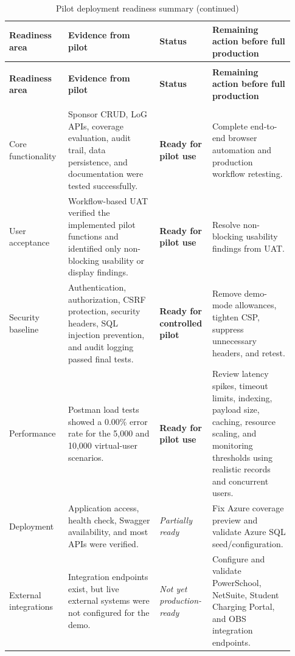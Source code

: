 \setlength{\LTleft}{0pt}
\setlength{\LTright}{\fill}
\begin{longtable}{>{\raggedright\arraybackslash}p{0.20\linewidth}
>{\raggedright\arraybackslash}p{0.31\linewidth}
>{\raggedright\arraybackslash}p{0.17\linewidth}
>{\raggedright\arraybackslash}p{0.25\linewidth}}
\caption{Pilot deployment readiness summary}\label{table:readiness-summary}\\
\toprule
\textbf{Readiness area} & \textbf{Evidence from pilot} & \textbf{Status} & \textbf{Remaining action before full production} \\
\midrule
\endfirsthead
\caption[]{Pilot deployment readiness summary (continued)}\\
\toprule
\textbf{Readiness area} & \textbf{Evidence from pilot} & \textbf{Status} & \textbf{Remaining action before full production} \\
\midrule
\endhead
\midrule
\multicolumn{4}{r}{\textit{Continued on next page}}\\
\endfoot
\bottomrule
\endlastfoot
Core functionality & Sponsor CRUD, LoG APIs, coverage evaluation, audit trail, data persistence, and documentation were tested successfully. & \textbf{Ready for pilot use} & Complete end-to-end browser automation and production workflow retesting. \\
User acceptance & Workflow-based UAT verified the implemented pilot functions and identified only non-blocking usability or display findings. & \textbf{Ready for pilot use} & Resolve non-blocking usability findings from UAT. \\
Security baseline & Authentication, authorization, CSRF protection, security headers, SQL injection prevention, and audit logging passed final tests. & \textbf{Ready for controlled pilot} & Remove demo-mode allowances, tighten CSP, suppress unnecessary headers, and retest. \\
Performance & Postman load tests showed a 0.00\% error rate for the 5,000 and 10,000 virtual-user scenarios. & \textbf{Ready for pilot use} & Review latency spikes, timeout limits, indexing, payload size, caching, resource scaling, and monitoring thresholds using realistic records and concurrent users. \\
Deployment & Application access, health check, Swagger availability, and most APIs were verified. & \textit{Partially ready} & Fix Azure coverage preview and validate Azure SQL seed/configuration. \\
External integrations & Integration endpoints exist, but live external systems were not configured for the demo. & \textit{Not yet production-ready} & Configure and validate PowerSchool, NetSuite, Student Charging Portal, and OBS integration endpoints. \\

\end{longtable}
